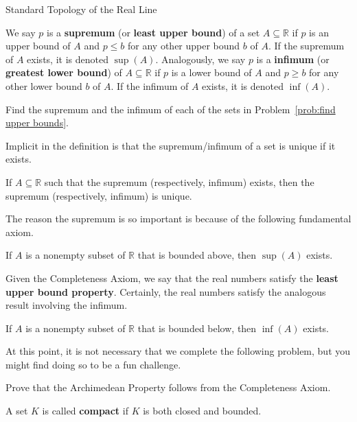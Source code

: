 \begin{section}{Standard Topology of the Real Line}
\begin{definition}
We say $p$ is a \textbf{supremum} (or \textbf{least upper bound}) of a set $A\subseteq \mathbb{R}$ if $p$ is an upper bound of $A$ and $p\leq b$ for any other upper bound $b$ of $A$. If the supremum of $A$ exists, it is denoted $\boxed{\sup(A)}$. Analogously, we say $p$ is a \textbf{infimum} (or \textbf{greatest lower bound}) of $A\subseteq \mathbb{R}$ if $p$ is a lower bound of $A$ and $p\geq b$ for any other lower bound $b$ of $A$. If the infimum of $A$ exists, it is denoted $\boxed{\inf(A)}$.
\end{definition}

\begin{problem}
Find the supremum and the infimum of each of the sets in Problem~\ref{prob:find upper bounds}.
\end{problem}

Implicit in the definition is that the supremum/infimum of a set is unique if it exists. 

\begin{theorem}
If $A\subseteq \mathbb{R}$ such that the supremum (respectively, infimum) exists, then the supremum (respectively, infimum) is unique.
\end{theorem}

The reason the supremum is so important is because of the following fundamental axiom.

\begin{axiom}\label{axiom:completeness}
If $A$ is a nonempty subset of $\mathbb{R}$ that is bounded above, then $\sup(A)$ exists.
\end{axiom}

Given the Completeness Axiom, we say that the real numbers satisfy the \textbf{least upper bound property}. Certainly, the real numbers satisfy the analogous result involving the infimum.

\begin{theorem}
If $A$ is a nonempty subset of $\mathbb{R}$ that is bounded below, then $\inf(A)$ exists.
\end{theorem}

At this point, it is not necessary that we complete the following problem, but you might find doing so to be a fun challenge.

\begin{problem}
Prove that the Archimedean Property follows from the Completeness Axiom.
\end{problem}

\begin{definition}
A set $K$ is called \textbf{compact} if $K$ is both closed and bounded.
\end{definition}


\end{section}
